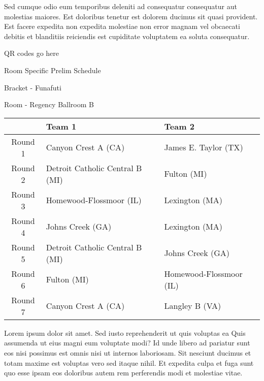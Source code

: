 \documentclass{article}%
\begin{document}
\newline%
Sed cumque odio eum temporibus deleniti ad consequatur consequatur aut molestias maiores. Est doloribus tenetur est dolorem ducimus sit quasi provident. Est facere expedita non expedita molestiae non error magnam vel obcaecati debitis et blanditiis reiciendis est cupiditate voluptatem ea soluta consequatur.%
\vspace*{140pt}%
\begin{center}%
\begin{Huge}%
QR codes go here%
\end{Huge}%
\end{center}%
\newpage%
\begin{center}%
\begin{Huge}%
Room Specific Prelim Schedule%
\end{Huge}%
\vspace*{8pt}%
\linebreak%
\begin{Large}%
Bracket {-} Funafuti%
\end{Large}%
\vspace*{8pt}%
\linebreak%
\vspace*{8pt}%
\begin{Large}%
Room {-} Regency Ballroom B%
\end{Large}%
\end{center}%
%
\begin{tabularx}{\textwidth}{|c|Y|Y|}%
\hline%
&Team 1&Team 2\\%
\hline%
Round 1&Canyon Crest A (CA)&James E. Taylor (TX)\\%
Round 2&Detroit Catholic Central B (MI)&Fulton (MI)\\%
Round 3&Homewood{-}Flossmoor (IL)&Lexington (MA)\\%
Round 4&Johns Creek (GA)&Lexington (MA)\\%
Round 5&Detroit Catholic Central B (MI)&Johns Creek (GA)\\%
Round 6&Fulton (MI)&Homewood{-}Flossmoor (IL)\\%
Round 7&Canyon Crest A (CA)&Langley B (VA)\\%
\hline%
\end{tabularx}%
\vspace*{8pt}%
\newline%
Lorem ipsum dolor sit amet. Sed iusto reprehenderit ut quis voluptas ea Quis assumenda ut eius magni eum voluptate modi? Id unde libero ad pariatur sunt eos nisi possimus est omnis nisi ut internos laboriosam. Sit nesciunt ducimus et totam maxime est voluptas vero sed itaque nihil. Et expedita culpa et fuga sunt quo esse ipsam eos doloribus autem rem perferendis modi et molestiae vitae.\newline%
\end{document}
